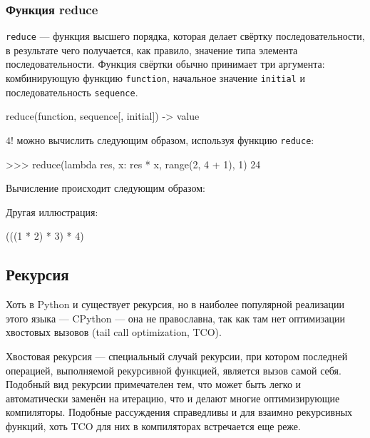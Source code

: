 \subsubsection{Функция reduce}
\lstinline{reduce} --- функция высшего порядка, которая делает свёртку последовательности, в результате чего получается, как правило, значение типа элемента последовательности. Функция свёртки обычно принимает три аргумента: комбинирующую функцию \lstinline{function}, начальное значение \lstinline{initial} и последовательность \lstinline{sequence}.
\begin{pylst}{}{}
reduce(function, sequence[, initial]) -> value
\end{pylst}

$4!$ можно вычислить следующим образом, используя функцию \lstinline{reduce}:
\begin{pylst}{}{}
>>> reduce(lambda res, x: res * x, range(2, 4 + 1), 1)
24
\end{pylst}

Вычисление происходит следующим образом:
\begin{center}
\end{center}

Другая иллюстрация:
\begin{pylst}{}{}
(((1 * 2) * 3) * 4)
\end{pylst}

\subsection{Рекурсия}
Хоть в Python и существует рекурсия, но в наиболее популярной реализации этого языка --- CPython --- она не православна, так как там нет оптимизации хвостовых вызовов (tail call optimization, TCO).

Хвостовая рекурсия --- специальный случай рекурсии, при котором последней операцией, выполняемой рекурсивной функцией, является вызов самой себя. Подобный вид рекурсии примечателен тем, что может быть легко и автоматически заменён на итерацию, что и делают многие оптимизирующие компиляторы. Подобные рассуждения справедливы и для взаимно рекурсивных функций, хоть TCO для них в компиляторах встречается еще реже.

